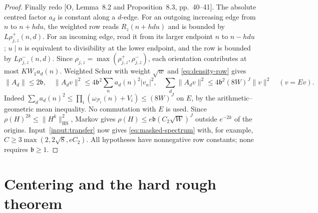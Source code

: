 \documentclass[11pt]{article}
\theoremstyle{definition}
\DeclareMathOperator{\HS}{HS}
\newcommand{\Pset}{\mathcal P}
\theoremstyle{remark}
\numberwithin{equation}{section}
\begin{document}
\begin{proof}
Finally redo [O, Lemma~8.2 and Proposition~8.3, pp.~40--41]. The absolute centred factor $a_d$ is constant along
a $d$-edge. For an outgoing increasing edge from $n$ to $n+hdu$, the weighted row reads
$R_z(n+hdu)$ and is bounded by $L\rho_{j,z}^+(n,d)$. For an incoming edge, read it from its larger endpoint
$n$ to $n-hdu$; $u\mid n$ is equivalent to divisibility at the lower endpoint, and the row is bounded by
$L\rho_{j,z}^-(n,d)$. Since $\rho_{j,z}=\max(\rho_{j,z}^+,\rho_{j,z}^-)$, each orientation contributes at most
$KW_1a_d(n)$. Weighted Schur with weight $\sqrt w$ and \eqref{eq:density-row} gives
\begin{equation}\label{eq:masked-schur}
 \|A_d\|\le2\mathfrak b,\quad
 \|A_dv\|^2\le4\mathfrak b^2\sum_n a_d(n)^2|v_n|^2,\quad
 \sum_d\|A_dv\|^2\le4\mathfrak b^2(8W)^J\|v\|^2\quad(v=Ev).
\end{equation}
Indeed $\sum_da_d(n)^2\le\prod_i(\omega_{\Pset_i}(n)+V_i)\le(8W)^J$ on $E$, by the arithmetic--geometric
mean inequality. No commutation with $E$ is used.
Since $\rho(H)^{2k}\le\|H^k\|_{\HS}^2$, Markov gives
$\rho(H)\le e\mathfrak b(C_2\sqrt W)^J$ outside $e^{-2k}$ of the origins.
Input~\ref{input:transfer} now gives \eqref{eq:masked-spectrum} with, for example,
$C\ge3\max(2,2\sqrt8,eC_2)$. All hypotheses have nonnegative row constants; none requires $\mathfrak b\ge1$.
\end{proof}

\section{Centering and the hard rough theorem}\label{sec:rough-proof}
\end{document}
